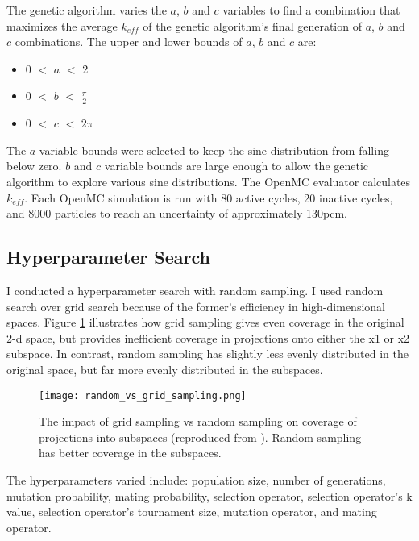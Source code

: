 The genetic algorithm varies the $a$, $b$ and $c$ variables to find a combination 
that maximizes the average $k_{eff}$ of the genetic algorithm's final generation 
of $a$, $b$ and $c$ combinations.
The upper and lower bounds of $a$, $b$ and $c$ are: 
\begin{itemize}
    \item 0 $<$ $a$ $<$ 2 
    \item 0 $<$ $b$ $<$ $\frac{\pi}{2}$
    \item 0 $<$ $c$ $<$ $2\pi$
\end{itemize}
The $a$ variable bounds were selected to keep the sine distribution from falling 
below zero. $b$ and $c$ variable bounds are large enough to allow the genetic 
algorithm to explore various sine distributions. 
The OpenMC evaluator calculates $k_{eff}$. 
Each OpenMC simulation is run with 80 active cycles, 20 inactive cycles, and 
8000 particles to reach an uncertainty of approximately 130pcm. 

\subsection{Hyperparameter Search}
I conducted a hyperparameter search with random sampling. 
I used random search over grid search because of the former's efficiency in 
high-dimensional spaces. 
Figure \ref{fig:random_vs_grid_sampling} illustrates how grid sampling gives 
even coverage in the original 2-d space, but provides inefficient coverage in 
projections onto either the x1 or x2 subspace.  
In contrast, random sampling has slightly less evenly distributed in the original 
space, but far more evenly distributed in the subspaces.
\begin{figure}[]
    \centering
    \texttt{[image: random\_vs\_grid\_sampling.png]} 
    \caption{The impact of grid sampling vs random sampling on coverage of projections 
    into subspaces (reproduced from \cite{}). Random sampling has better coverage 
    in the subspaces.}
    \label{fig:random_vs_grid_sampling}
\end{figure}
The hyperparameters varied include: population size, number of generations, 
mutation probability, mating probability, selection operator, selection operator's 
k value, selection operator's tournament size, mutation operator, and mating 
operator.  

